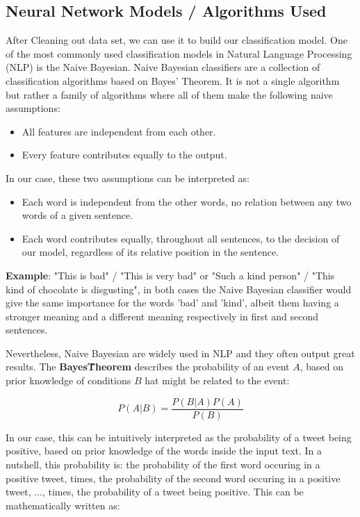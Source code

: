 \documentclass{article}
\begin{document}
\subsection{Neural Network Models / Algorithms Used}
After Cleaning out data set, we can use it to build our classification model. One of the most commonly used classification models in Natural Language Processing (NLP) is the Naive Bayesian.
Naive Bayesian classifiers are a collection of classification algorithms based on Bayes’ Theorem. It is not a single algorithm but rather a family of algorithms where all of them make the following naive assumptions:
\begin{itemize}
    \item All features are independent from each other.
    \item Every feature contributes equally to the output.
\end{itemize}

In our case, these two assumptions can be interpreted as:
\begin{itemize}
    \item Each word is independent from the other words, no relation between any two words of a given sentence.
    \item Each word contributes equally, throughout all sentences, to the decision of our model, regardless of its relative position in the sentence.
\end{itemize}
\textbf{Example}: "This is bad" / "This is very bad" or "Such a kind person" / "This kind of chocolate is disgusting", in both cases the Naive Bayesian classifier would give the same importance for the words 'bad' and 'kind', albeit them having a stronger meaning and a different meaning respectively in first and second sentences.

Nevertheless, Naive Bayesian are widely used in NLP and they often output great results.
The \textbf{Bayes\'  Theorem} describes the probability of an event $A$, based on prior knowledge of conditions $B$ hat might be related to the event: 

\begin{equation}
    P(A|B) = \frac{P(B|A)P(A)}{P(B)}  
\end{equation}

In our case, this can be intuitively interpreted as the probability of a tweet being positive, based on prior knowledge of the words inside the input text. In a nutshell, this probability is: the probability of the first word occuring in a positive tweet, times, the probability of the second word occuring in a positive tweet, ..., times, the probability of a tweet being positive. This can be mathematically written as: 
\end{document}
